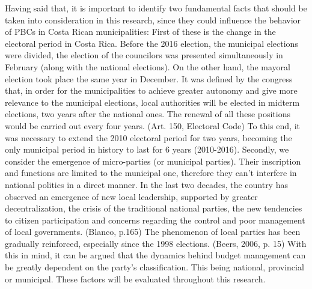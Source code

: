 Having said that, it is important to identify two fundamental facts that should be taken into consideration in this research, since they could influence the behavior of PBCs in Costa Rican municipalities: First of these is the change in the electoral period in Costa Rica. Before the 2016 election, the municipal elections were divided, the election of the councilors was presented simultaneously in February (along with the national elections). On the other hand, the mayoral election took place the same year in December. It was defined by the congress that, in order for the municipalities to achieve greater autonomy and give more relevance to the municipal elections, local authorities will be elected in midterm elections, two years after the national ones. The renewal of all these positions would be carried out every four years. (Art. 150, Electoral Code) To this end, it was necessary to extend the 2010 electoral period for two years, becoming the only municipal period in history to last for 6 years (2010-2016). Secondly, we consider the emergence of micro-parties (or municipal parties). Their inscription and functions are limited to the municipal one, therefore they can't interfere in national politics in a direct manner. In the last two decades, the country has observed an emergence of new local leadership, supported by greater decentralization, the crisis of the traditional national parties, the new tendencies to citizen participation and concerns regarding the control and poor management of local governments. (Blanco, p.165) The phenomenon of local parties has been gradually reinforced, especially since the 1998 elections. (Beers, 2006, p. 15) With this in mind, it can be argued that the dynamics behind budget management can be greatly dependent on the party's classification. This being national, provincial or municipal. These factors will be evaluated throughout this research.
